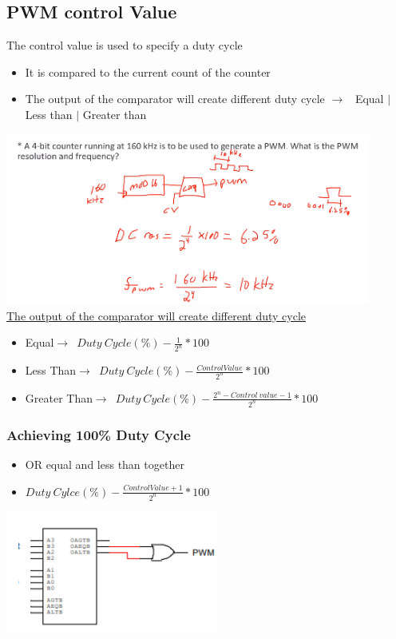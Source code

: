 \documentclass[a4paper,12pt]{article}
\newcommand{\ra}{$\rightarrow$}
\begin{document}
    \subsection{PWM control Value}
    The control value is used to specify a duty cycle
    \begin{itemize}
        \item It is compared to the current count of the counter
        \item The output of the comparator will create different duty cycle \ra~ Equal $|$ Less than $|$ Greater than    
    \end{itemize}
    \includegraphics[width=12cm]{Ex1.png}
    \\\underline{The output of the comparator will create different duty cycle}
    \begin{itemize}
        \item Equal\ra~\(Duty~Cycle(\%)-\frac{1}{2^n}*100\)
        \item Less Than\ra~\(Duty~Cycle(\%)-\frac{Control Value}{2^n}*100\)
        \item Greater Than\ra~\(Duty~Cycle(\%)-\frac{2^n-Control~value-1}{2^n}*100\)
    \end{itemize}
    
        \subsubsection{Achieving 100\% Duty Cycle}
            \begin{itemize}
                \item OR equal and less than together
                \item \(Duty~Cylce(\%)-\frac{ControlValue+1}{2^n}*100\)
            \end{itemize}
            \includegraphics[width=7cm]{Achieving100Duty.png}
\end{document}
